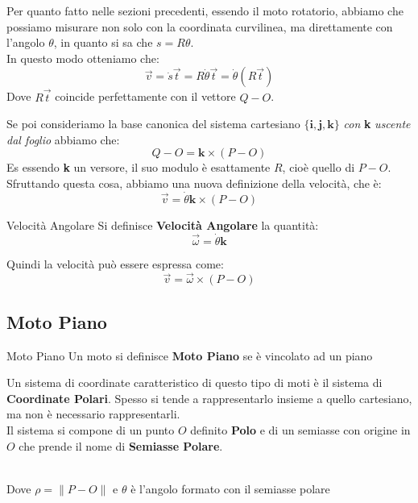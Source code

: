 \documentclass[11pt,a4paper,twoside]{article}
\theoremstyle{definition}
\begin{document}
Per quanto fatto nelle sezioni precedenti, essendo il moto rotatorio, abbiamo che possiamo misurare non solo con la coordinata curvilinea, ma direttamente con l'angolo $\theta$, in quanto si sa che $s = R \theta$.\\
In questo modo otteniamo che:
\[ \vec v = \dot s \vec t = R \dot \theta \vec t = \dot \theta (R \vec t) \]
Dove $R \vec t$ coincide perfettamente con il vettore $Q-O$.

Se poi consideriamo la base canonica del sistema cartesiano $\{\mathbf i, \mathbf j, \mathbf k\}$ \textit{con} \textbf k \textit{uscente dal foglio} abbiamo che:
\[Q-O = \mathbf k \times (P-O)\]
Es essendo \textbf k un versore, il suo modulo è esattamente $R$, cioè quello di $P-O$.\\
Sfruttando questa cosa, abbiamo una nuova definizione della velocità, che è:
\[\vec v = \dot \theta \mathbf k \times (P-O)\]

\begin{defn}{Velocità Angolare}{}
	Si definisce \textbf{Velocità Angolare} la quantità:
	\[\vec \omega = \dot \theta \mathbf k\]
\end{defn}

Quindi la velocità può essere espressa come:
\[\vec v = \vec \omega \times (P-O)\]

\subsection{Moto Piano}

\begin{defn}{Moto Piano}{}
	Un moto si definisce \textbf{Moto Piano} se è vincolato ad un piano
\end{defn}

Un sistema di coordinate caratteristico di questo tipo di moti è il sistema di \textbf{Coordinate Polari}.
Spesso si tende a rappresentarlo insieme a quello cartesiano, ma non è necessario rappresentarli.\\
Il sistema si compone di un punto $O$ definito \textbf{Polo} e di un semiasse con origine in $O$ che prende il nome di \textbf{Semiasse Polare}.

\begin{center}
	\\
	Dove $\rho = \| P-O\|$ e $\theta$ è l'angolo formato con il semiasse polare
\end{center}
\end{document}
